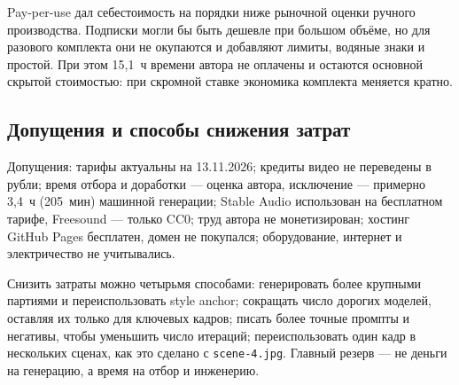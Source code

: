 \documentclass[12pt, a4paper]{article}
\begin{document}
Pay-per-use дал себестоимость на порядки ниже рыночной оценки ручного производства. Подписки могли бы быть дешевле при большом объёме, но для разового комплекта они не окупаются и добавляют лимиты, водяные знаки и простой. При этом 15{,}1~ч времени автора не оплачены и остаются основной скрытой стоимостью: при скромной ставке экономика комплекта меняется кратно.

\subsection{Допущения и способы снижения затрат}
Допущения: тарифы актуальны на 13.11.2026; кредиты видео не переведены в рубли; время отбора и доработки --- оценка автора, исключение --- примерно 3{,}4~ч (205~мин) машинной генерации; Stable Audio использован на бесплатном тарифе, Freesound --- только CC0; труд автора не монетизирован; хостинг GitHub Pages бесплатен, домен не покупался; оборудование, интернет и электричество не учитывались.

Снизить затраты можно четырьмя способами: генерировать более крупными партиями и переиспользовать style anchor; сокращать число дорогих моделей, оставляя их только для ключевых кадров; писать более точные промпты и негативы, чтобы уменьшить число итераций; переиспользовать один кадр в нескольких сценах, как это сделано с \texttt{scene-4.jpg}. Главный резерв --- не деньги на генерацию, а время на отбор и инженерию.
\end{document}
